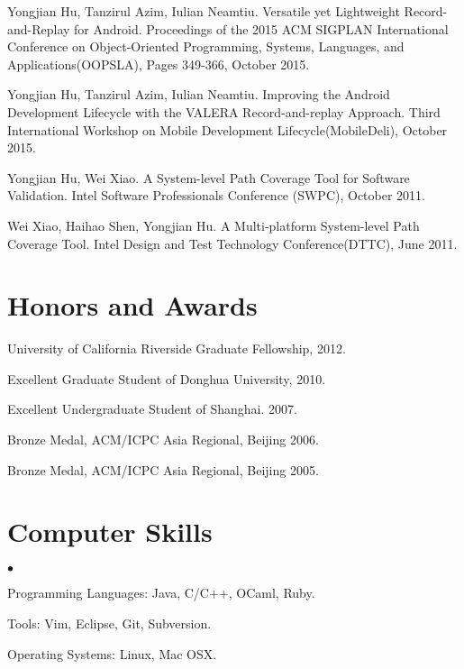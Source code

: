 \documentclass[margin,line]{res}
\newenvironment{list2}{
  \begin{list}{$\bullet$}{%
      \setlength{\itemsep}{0in}
      \setlength{\parsep}{0in} \setlength{\parskip}{0in}
      \setlength{\topsep}{0in} \setlength{\partopsep}{0in} 
      \setlength{\leftmargin}{0.2in}}}{\end{list}}
\begin{document}
\begin{resume}
Yongjian Hu, Tanzirul Azim, Iulian Neamtiu. Versatile yet Lightweight Record-and-Replay for Android.
Proceedings of the 2015 ACM SIGPLAN International Conference on Object-Oriented Programming, Systems, Languages, and Applications(OOPSLA),
Pages 349-366, October 2015.

Yongjian Hu, Tanzirul Azim, Iulian Neamtiu. Improving the Android Development Lifecycle with the VALERA Record-and-replay Approach.
Third International Workshop on Mobile Development Lifecycle(MobileDeli), October 2015.


Yongjian Hu, Wei Xiao. A System-level Path Coverage Tool for Software Validation.
Intel Software Professionals Conference (SWPC), October 2011.

Wei Xiao, Haihao Shen, Yongjian Hu. A Multi-platform System-level Path Coverage Tool.
Intel Design and Test Technology Conference(DTTC), June 2011.





\section{\sc Honors and Awards} 
University of California Riverside Graduate Fellowship, 2012.

\vspace*{-2.5mm}
Excellent Graduate Student of Donghua University, 2010.

\vspace*{-2.5mm}
Excellent Undergraduate Student of Shanghai. 2007.

\vspace*{-2.5mm}
Bronze Medal, ACM/ICPC Asia Regional, Beijing 2006.

\vspace*{-2.5mm}
Bronze Medal, ACM/ICPC Asia Regional, Beijing 2005.

\section{\sc Computer Skills} 
\begin{list2}
\item Programming Languages: Java, C/C++, OCaml, Ruby.
\item Tools: Vim, Eclipse, Git, Subversion.
\item Operating Systems: Linux, Mac OSX.
\end{list2}



\end{resume}
\end{document}
